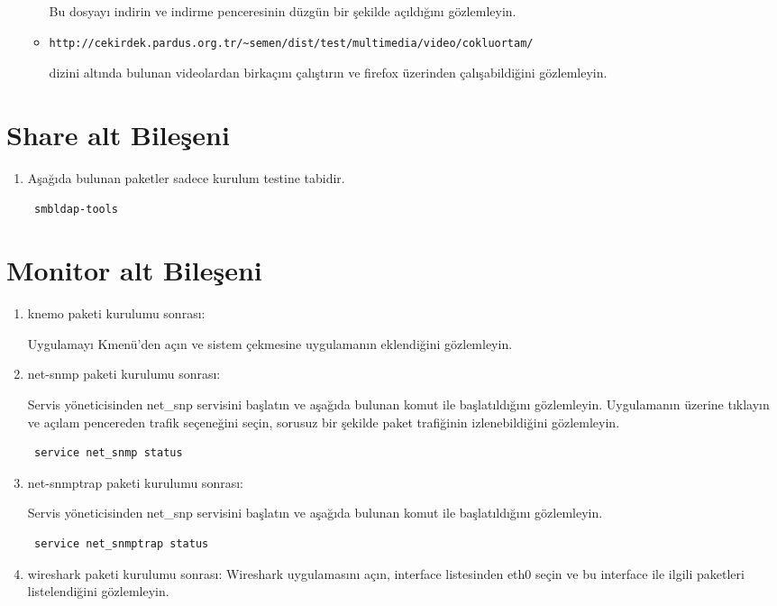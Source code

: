 \documentclass[a4paper,10pt]{article}
\begin{document}
\begin{enumerate}
\begin{itemize}
Bu dosyayı indirin ve indirme penceresinin düzgün bir şekilde açıldığını gözlemleyin.
\item \begin{verbatim}http://cekirdek.pardus.org.tr/~semen/dist/test/multimedia/video/cokluortam/\end{verbatim} dizini altında bulunan videolardan birkaçını çalıştırın ve firefox üzerinden çalışabildiğini gözlemleyin.

\end{itemize}

\end{enumerate}

\section{Share alt Bileşeni}
\begin{enumerate}
 \item Aşağıda bulunan paketler sadece kurulum testine tabidir.
\begin{verbatim}
 smbldap-tools
\end{verbatim}

\end{enumerate}

\section{Monitor alt Bileşeni}
\begin{enumerate}
\item knemo paketi kurulumu sonrası:

Uygulamayı Kmenü'den açın ve sistem çekmesine uygulamanın  eklendiğini gözlemleyin. 
 \item net-snmp paketi kurulumu sonrası:

Servis yöneticisinden net\_snp servisini başlatın ve aşağıda bulunan komut ile başlatıldığını gözlemleyin. Uygulamanın üzerine tıklayın ve açılam pencereden trafik seçeneğini seçin, sorusuz bir şekilde paket trafiğinin izlenebildiğini gözlemleyin.

\begin{verbatim}
 service net_snmp status
\end{verbatim}

\item net-snmptrap paketi kurulumu sonrası:

Servis yöneticisinden net\_snp servisini başlatın ve aşağıda bulunan komut ile başlatıldığını gözlemleyin.
\begin{verbatim}
 service net_snmptrap status
\end{verbatim}



 \item wireshark paketi kurulumu sonrası:
	Wireshark uygulamasını açın, interface listesinden eth0 seçin ve bu interface ile ilgili paketleri listelendiğini gözlemleyin.
\end{enumerate}
\end{document}
